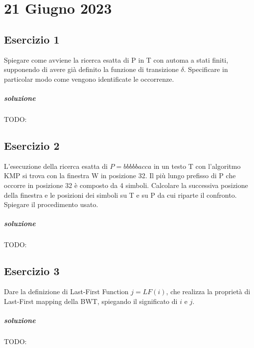 \chapter{21 Giugno 2023}

\section{Esercizio 1}

Spiegare come avviene la ricerca esatta di P in T con automa a stati finiti, supponendo di avere già definito la funzione di transizione $\delta$.
Specificare in particolar modo come vengono identificate le occorrenze.

\paragraph{soluzione} TODO:

\section{Esercizio 2}

L'esecuzione della ricerca esatta di $P = bbbbbacca$ in un testo T con l'algoritmo KMP si trova con la finestra W in posizione 32.
Il più lungo prefisso di P che occorre in posizione 32 \`e composto da 4 simboli. Calcolare la successiva posizione della finestra e le posizioni dei simboli su T e su P da cui riparte il confronto.
Spiegare il procedimento usato.

\paragraph{soluzione} TODO:

\section{Esercizio 3}

Dare la definizione di Last-First Function $j = LF(i)$, che realizza la proprietà di Last-First mapping della BWT, spiegando il significato di $i$ e $j$.

\paragraph{soluzione} TODO:
